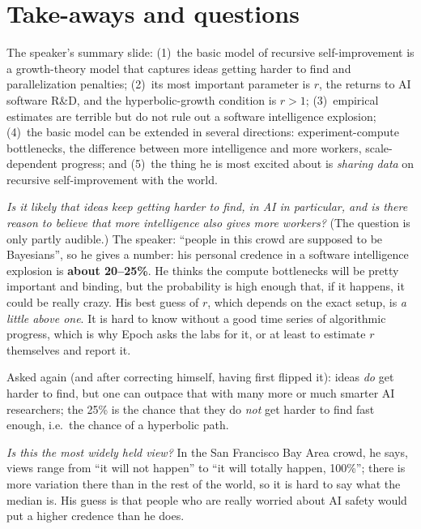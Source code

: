\section{Take-aways and questions}\label{sec:L4-questions}
The speaker's summary slide: (1)~the basic model of recursive self-improvement is a growth-theory model that captures ideas getting harder to find and parallelization penalties; (2)~its most important parameter is $r$, the returns to AI software R\&D, and the hyperbolic-growth condition is $r>1$; (3)~empirical estimates are terrible but do not rule out a software intelligence explosion; (4)~the basic model can be extended in several directions: experiment-compute bottlenecks, the difference between more intelligence and more workers, scale-dependent progress; and (5)~the thing he is most excited about is \emph{sharing data} on recursive self-improvement with the world.

\begin{discussion}[Credences]\label{disc:L4-credence}
\emph{Is it likely that ideas keep getting harder to find, in AI in particular, and is there reason to believe that more intelligence also gives more workers?} (The question is only partly audible.) The speaker: ``people in this crowd are supposed to be Bayesians'', so he gives a number: his personal credence in a software intelligence explosion is \textbf{about 20--25\%}. He thinks the compute bottlenecks will be pretty important and binding, but the probability is high enough that, if it happens, it could be really crazy. His best guess of $r$, which depends on the exact setup, is \emph{a little above one}. It is hard to know without a good time series of algorithmic progress, which is why Epoch asks the labs for it, or at least to estimate $r$ themselves and report it.


Asked again (and after correcting himself, having first flipped it): ideas \emph{do} get harder to find, but one can outpace that with many more or much smarter AI researchers; the 25\% is the chance that they do \emph{not} get harder to find fast enough, i.e.\ the chance of a hyperbolic path.


\emph{Is this the most widely held view?} In the San Francisco Bay Area crowd, he says, views range from ``it will not happen'' to ``it will totally happen, 100\%''; there is more variation there than in the rest of the world, so it is hard to say what the median is. His guess is that people who are really worried about AI safety would put a higher credence than he does.
\end{discussion}

